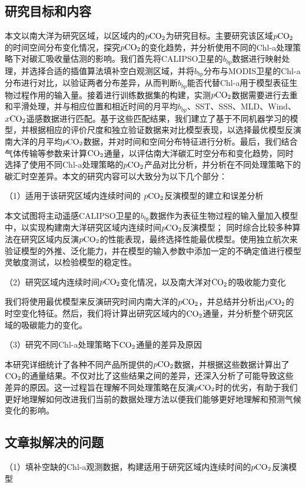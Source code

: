 \subsection{研究目标和内容}
本文以南大洋为研究区域，以区域内的$p\rm CO_2$为研究目标。主要研究该区域$p\rm CO_2$的时间空间分布变化情况，探究$p\rm CO_2$的变化趋势，并分析使用不同的Chl-a处理策略下对碳汇吸收量估测的影响。我们首先将CALIPSO卫星的$b_{bp}$数据进行映射处理，并选择合适的插值算法填补空白观测区域，并将$b_{bp}$分布与MODIS卫星的Chl-a分布进行对比，以验证两者分布差异，从而判断$b_{bp}$能否代替Chl-a用于模型表征生物过程作用的输入量。接着进行训练数据集的构建，实测$p\rm CO_2$数据需要进行去重和平滑处理，并与相应位置和相近时间的月平均$b_{bp}$、SST、SSS、MLD、Wind、$x\rm CO_2$遥感数据进行匹配。基于这些匹配结果，我们建立了基于不同机器学习的模型，并根据相应的评价尺度和独立验证数据来对比模型表现，以选择最优模型反演南大洋的月平均$p\rm CO_2$数据，并对时间和空间分布特征进行分析。最后，我们结合气体传输等参数来计算$\rm CO_2$通量，以评估南大洋碳汇时空分布和变化趋势，同时选择了使用不同Chl-a处理策略的$p\rm CO_2$产品对比分析，并分析在不同处理策略下的碳汇时空差异。本文的研究内容可以大致分为以下几个部分：

（1）适用于该研究区域内连续时间的 $p\rm CO_2$反演模型的建立和误差分析

本文试图将主动遥感CALIPSO卫星的$b_{bp}$数据作为表征生物过程的输入量加入模型中，以实现构建南大洋研究区域内连续时间$p\rm CO_2$反演模型；
同时综合比较多种算法在研究区域内反演$p\rm CO_2$的性能表现，最终选择性能最优模型。使用独立航次来验证模型的外推、泛化能力，并在模型的输入参数中添加一定的不确定值进行模型灵敏度测试，以检验模型的稳定性。

（2）研究区域内连续时间$p\rm CO_2$变化情况，以及南大洋对$\rm CO_2$的吸收能力变化

我们将使用最优模型来反演研究时间内南大洋的$p\rm CO_2$，并总结并分析出$p\rm CO_2$的时空变化特征。然后，我们将计算出研究区域内的$\rm CO_2$通量，并分析整个研究区域的吸碳能力的变化。

（3）研究不同Chl-a处理策略下$\rm CO_2$通量的差异及原因

本研究详细统计了各种不同产品所提供的$p\rm CO_2$数据，并根据这些数据计算出了$\rm CO_2$的通量结果。不仅对比了这些结果之间的差异，还深入分析了可能导致这些差异的原因。这一过程旨在理解不同处理策略在反演$p\rm CO_2$时的优劣，有助于我们更好地理解如何改进我们当前的数据处理方法以便我们能够更好地理解和预测气候变化的影响。

\subsection{文章拟解决的问题}
（1）填补空缺的Chl-a观测数据，构建适用于研究区域内连续时间的$p\rm CO_2$反演模型

